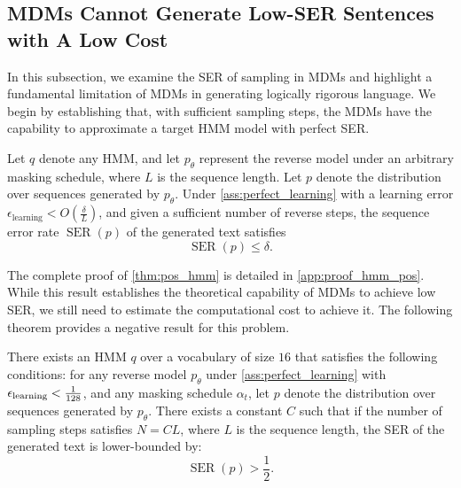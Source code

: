 \subsection{MDMs Cannot Generate Low-SER Sentences with A Low Cost}
\label{sec:negative}

In this subsection, we examine the SER of sampling in MDMs and highlight a fundamental limitation of MDMs in generating logically rigorous language. We begin by establishing that, with sufficient sampling steps, the MDMs have the capability to approximate a target HMM model with perfect SER. 


\begin{theorem}
\label{thm:pos_hmm}
    Let $q$ denote any HMM, and let $p_\mathsf{\theta}$ represent the reverse model under an arbitrary masking schedule, where $L$ is the sequence length. Let $p$ denote the distribution over sequences generated by $p_\mathsf{\theta}$. Under \cref{ass:perfect_learning} with a learning error $\epsilon_\text{learning} < O(\frac{\delta}{L})$, and given a sufficient number of reverse steps, the sequence error rate $\operatorname{SER}(p)$ of the generated text satisfies 
    \[
    \operatorname{SER}(p) \leq  \delta.
    \]
\end{theorem}

The complete proof of \cref{thm:pos_hmm} is detailed in \cref{app:proof_hmm_pos}. While this result establishes the theoretical capability of MDMs to achieve low SER, we still need to estimate the computational cost to achieve it. The following theorem provides a negative result for this problem.


\begin{theorem}
\label{thm:negative}
    There exists an HMM $q$ over a vocabulary of size $16$ that satisfies the following conditions: for any reverse model $p_\mathsf{\theta}$ under \cref{ass:perfect_learning} with ${\epsilon}_\mathrm{learning}<\frac{1}{128}$, and any masking schedule $\alpha_t$, let $p$ denote the distribution over sequences generated by $p_\mathsf{\theta}$. There exists a constant $C$ such that if the number of sampling steps satisfies $N = CL$, where $L$ is the sequence length, the SER of the generated text is lower-bounded by:
    \begin{equation*}
        \operatorname{SER}(p) > \frac{1}{2}.
    \end{equation*}
\end{theorem}



